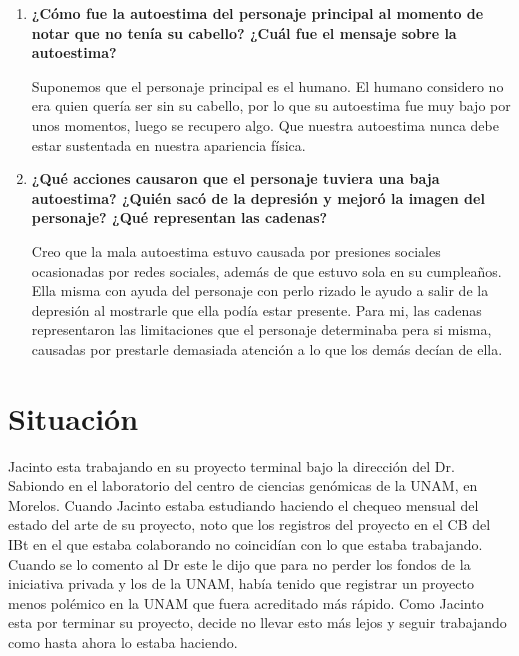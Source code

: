 \documentclass[12pt]{article}
\begin{document}
\begin{enumerate}
	\item \textbf{ ¿Cómo fue la autoestima del personaje principal al momento de notar que no tenía su cabello? ¿Cuál fue el mensaje sobre la autoestima? }
	
	Suponemos que el personaje principal es el humano. El humano considero no era quien quería ser sin su cabello, por lo que su autoestima fue muy bajo por unos momentos, luego se recupero algo. Que nuestra autoestima nunca debe estar sustentada en nuestra apariencia física.
	
	\item \textbf{ ¿Qué acciones causaron que el personaje tuviera una baja autoestima? ¿Quién sacó de la depresión y mejoró la imagen del personaje? ¿Qué representan las cadenas? }
	
	Creo que la mala autoestima estuvo causada por presiones sociales ocasionadas por redes sociales, además de que estuvo sola en su cumpleaños. Ella misma con ayuda del personaje con perlo rizado le ayudo a salir de la depresión al mostrarle que ella podía estar presente. Para mi, las cadenas representaron las limitaciones que el personaje determinaba pera si misma, causadas por prestarle demasiada atención a lo que los demás decían de ella.
\end{enumerate}



\section{Situaci\'on}

Jacinto esta trabajando en su proyecto terminal bajo la dirección del Dr. Sabiondo en el laboratorio del centro de ciencias genómicas de la UNAM, en Morelos. Cuando Jacinto estaba estudiando haciendo el chequeo mensual del estado del arte de su proyecto, noto que los registros del proyecto en el CB del IBt en el que estaba colaborando no coincidían con lo que estaba trabajando. Cuando se lo comento al Dr este le dijo que para no perder los fondos de la iniciativa privada y los de la UNAM, había tenido que registrar un proyecto menos polémico en la UNAM que fuera acreditado más rápido. Como Jacinto esta por terminar su proyecto, decide no llevar esto más lejos y seguir trabajando como hasta ahora lo estaba haciendo.
\end{document}
